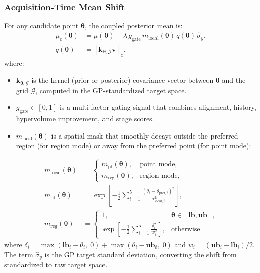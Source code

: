 \documentclass[journal]{IEEEtran}
\newcommand{\btheta}{\boldsymbol{\theta}}
\newcommand{\bG}{\mathcal{G}}
\begin{document}
\subsubsection{Acquisition-Time Mean Shift}

For any candidate point $\btheta$, the coupled posterior mean is:
\begin{align}
\mu_{\text{c}}(\btheta) &=
\mu(\btheta)-\lambda\,g_{\text{gate}}\,
m_{\text{local}}(\btheta)\,q(\btheta)\,\hat{\sigma}_y,
\label{eq:coupled_mean}\\
q(\btheta) &= [\mathbf{k}_{\btheta,\bG}\mathbf{v}]_z . \nonumber
\end{align}
where:
\begin{itemize}
\item $\mathbf{k}_{\btheta,\bG}$ is the kernel (prior or posterior) covariance vector between $\btheta$ and the grid $\bG$, computed in the GP-standardized target space.
\item $g_{\text{gate}} \in [0,1]$ is a multi-factor gating signal that combines alignment, history, hypervolume improvement, and stage scores.
\item $m_{\text{local}}(\btheta)$ is a spatial mask that smoothly decays outside the preferred region (for region mode) or away from the preferred point (for point mode):
\end{itemize}
\begin{align}
m_{\text{local}}(\btheta) &=
\begin{cases}
m_{\text{pt}}(\btheta), & \text{point mode},\\
m_{\text{reg}}(\btheta), & \text{region mode},
\end{cases}
\label{eq:local_mask}\\
m_{\text{pt}}(\btheta) &=
\exp\!\left[-\frac{1}{2}\sum_{i=1}^{5}
\frac{(\theta_i-\theta_{\text{pref},i})^2}{\sigma_{\text{local},i}^2}\right],
\nonumber\\
m_{\text{reg}}(\btheta) &=
\begin{cases}
1, & \btheta \in [\mathbf{lb}, \mathbf{ub}],\\
\exp\!\left[-\frac{1}{2}\sum_{i=1}^{5}\frac{\delta_i^2}{w_i^2}\right],
& \text{otherwise}.
\end{cases}
\nonumber
\end{align}
where $\delta_i = \max(\mathbf{lb}_i - \theta_i,\; 0) + \max(\theta_i - \mathbf{ub}_i,\; 0)$ and $w_i = (\mathbf{ub}_i - \mathbf{lb}_i)/2$. The term $\hat{\sigma}_y$ is the GP target standard deviation, converting the shift from standardized to raw target space.
\end{document}
